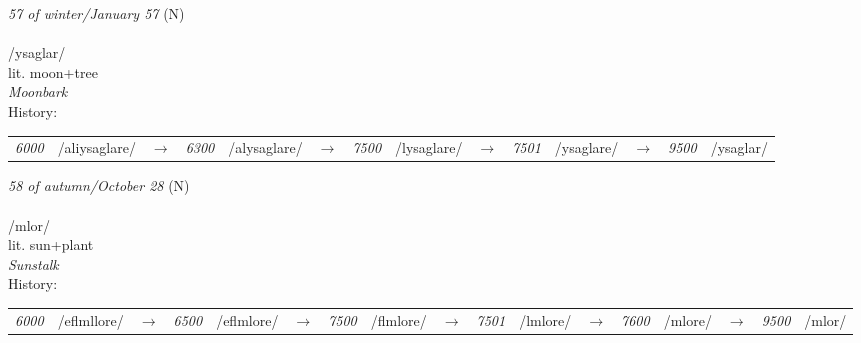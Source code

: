\vspace{15pt}
\begin{nopagebreak}
 \textit{57 of winter/January 57} (N)\\
\\
\noindent /ys{\textprimstress}aglar/\\
\noindent lit. moon+tree\\
\noindent \textit{Moonbark}\\


\noindent History:

\vspace{-0pt}
\hspace{40pt}
\begin{tabular}{ccc}
\textit{6000} & /aliysaglare/&$\rightarrow$ & \textit{6300} & /alysaglare/&$\rightarrow$ & \textit{7500} & /lysaglare/&$\rightarrow$ & \textit{7501} & /ysaglare/&$\rightarrow$ & \textit{9500} & /ysaglar/& \\
\end{tabular}

\vspace{20pt}\hline

\end{nopagebreak}
\filbreak



\vspace{15pt}
\begin{nopagebreak}
 \textit{58 of autumn/October 28} (N)\\
\\
\noindent /ml{\textprimstress}or/\\
\noindent lit. sun+plant\\
\noindent \textit{Sunstalk}\\


\noindent History:

\vspace{-0pt}
\hspace{40pt}
\begin{tabular}{ccc}
\textit{6000} & /eflmllore/&$\rightarrow$ & \textit{6500} & /eflmlore/&$\rightarrow$ & \textit{7500} & /flmlore/&$\rightarrow$ & \textit{7501} & /lmlore/&$\rightarrow$ & \textit{7600} & /mlore/&$\rightarrow$ & \textit{9500} & /mlor/& \\
\end{tabular}

\vspace{20pt}\hline

\end{nopagebreak}
\filbreak



